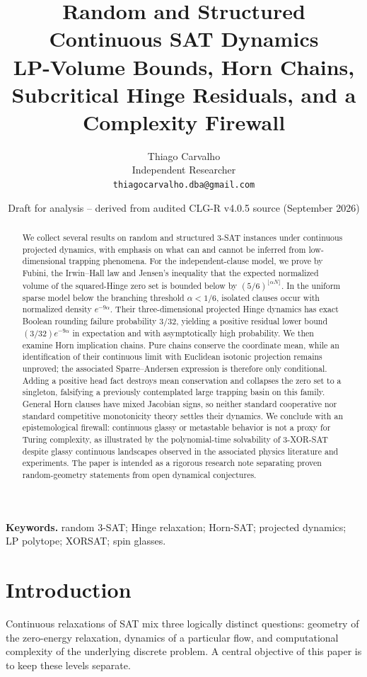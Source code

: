 \documentclass[11pt,a4paper]{article}
\title{\textbf{Random and Structured Continuous SAT Dynamics}\\[0.3em]
\large LP-Volume Bounds, Horn Chains, Subcritical Hinge Residuals, and a Complexity Firewall}
\author{Thiago Carvalho\\Independent Researcher\\\texttt{thiagocarvalho.dba@gmail.com}}
\date{Draft for analysis -- derived from audited CLG-R v4.0.5 source (September 2026)}
\begin{document}
\maketitle

\begin{abstract}
We collect several results on random and structured 3-SAT instances under continuous projected dynamics, with emphasis on what can and cannot be inferred from low-dimensional trapping phenomena. For the independent-clause model, we prove by Fubini, the Irwin--Hall law and Jensen's inequality that the expected normalized volume of the squared-Hinge zero set is bounded below by $(5/6)^{\lfloor\alpha N\rfloor}$. In the uniform sparse model below the branching threshold $\alpha<1/6$, isolated clauses occur with normalized density $e^{-9\alpha}$. Their three-dimensional projected Hinge dynamics has exact Boolean rounding failure probability $3/32$, yielding a positive residual lower bound $(3/32)e^{-9\alpha}$ in expectation and with asymptotically high probability. We then examine Horn implication chains. Pure chains conserve the coordinate mean, while an identification of their continuous limit with Euclidean isotonic projection remains unproved; the associated Sparre--Andersen expression is therefore only conditional. Adding a positive head fact destroys mean conservation and collapses the zero set to a singleton, falsifying a previously contemplated large trapping basin on this family. General Horn clauses have mixed Jacobian signs, so neither standard cooperative nor standard competitive monotonicity theory settles their dynamics. We conclude with an epistemological firewall: continuous glassy or metastable behavior is not a proxy for Turing complexity, as illustrated by the polynomial-time solvability of 3-XOR-SAT despite glassy continuous landscapes observed in the associated physics literature and experiments. The paper is intended as a rigorous research note separating proven random-geometry statements from open dynamical conjectures.
\end{abstract}

\noindent\textbf{Keywords.} random 3-SAT; Hinge relaxation; Horn-SAT; projected dynamics; LP polytope; XORSAT; spin glasses.

\section{Introduction}
Continuous relaxations of SAT mix three logically distinct questions: geometry of the zero-energy relaxation, dynamics of a particular flow, and computational complexity of the underlying discrete problem. A central objective of this paper is to keep these levels separate.
\end{document}
